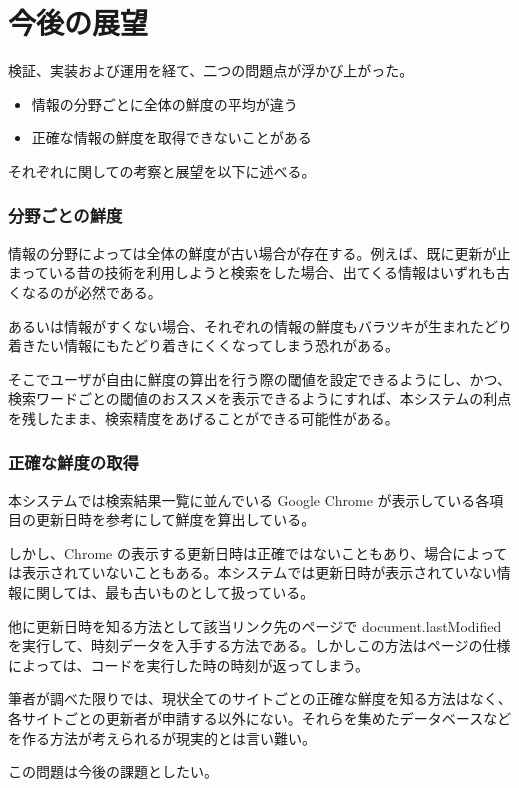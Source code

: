 \section{今後の展望}

検証、実装および運用を経て、二つの問題点が浮かび上がった。

\begin{itemize}
  \item 情報の分野ごとに全体の鮮度の平均が違う
  \item 正確な情報の鮮度を取得できないことがある
\end{itemize}

それぞれに関しての考察と展望を以下に述べる。

\subsubsection{分野ごとの鮮度}

情報の分野によっては全体の鮮度が古い場合が存在する。例えば、既に更新が止まっている昔の技術を利用しようと検索をした場合、出てくる情報はいずれも古くなるのが必然である。

あるいは情報がすくない場合、それぞれの情報の鮮度もバラツキが生まれたどり着きたい情報にもたどり着きにくくなってしまう恐れがある。

そこでユーザが自由に鮮度の算出を行う際の閾値を設定できるようにし、かつ、検索ワードごとの閾値のおススメを表示できるようにすれば、本システムの利点を残したまま、検索精度をあげることができる可能性がある。

\subsubsection{正確な鮮度の取得}

本システムでは検索結果一覧に並んでいる Google Chrome が表示している各項目の更新日時を参考にして鮮度を算出している。

しかし、Chrome の表示する更新日時は正確ではないこともあり、場合によっては表示されていないこともある。本システムでは更新日時が表示されていない情報に関しては、最も古いものとして扱っている。

他に更新日時を知る方法として該当リンク先のページで document.lastModified を実行して、時刻データを入手する方法である。しかしこの方法はページの仕様によっては、コードを実行した時の時刻が返ってしまう。

筆者が調べた限りでは、現状全てのサイトごとの正確な鮮度を知る方法はなく、各サイトごとの更新者が申請する以外にない。それらを集めたデータベースなどを作る方法が考えられるが現実的とは言い難い。

この問題は今後の課題としたい。
